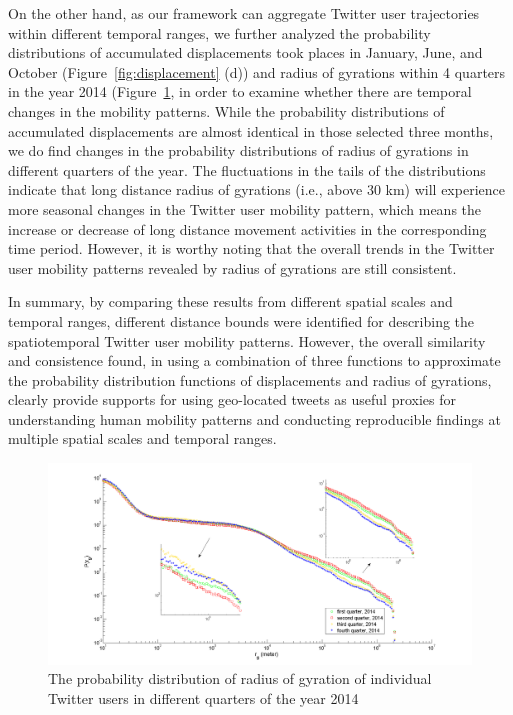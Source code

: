 \documentclass[ijgi,article,accept,moreauthors,pdftex,10pt,a4paper]{mdpi}
\theoremstyle{mdpi}
\newcounter{ex}
\newcounter{re}
\theoremstyle{mdpidefinition}
\begin{document}
On the other hand, as our framework can aggregate Twitter user trajectories within different temporal ranges, we further analyzed the probability distributions of accumulated displacements took places in January, June, and October (Figure~\ref{fig:displacement} (d)) and radius of gyrations within 4 quarters in the year 2014 (Figure~\ref{fig:gyration_season}, in order to examine whether there are temporal changes in the mobility patterns.
While the probability distributions of accumulated displacements are almost identical in those selected three months,  we do find changes in the probability distributions of radius of gyrations in different quarters of the year. 
The fluctuations in the tails of the distributions indicate that long distance radius of gyrations (i.e., above 30 km) will experience more seasonal changes in the Twitter user mobility pattern, which means the increase or decrease of long distance movement activities in the corresponding time period. 
However, it is worthy noting that the overall trends in the Twitter user mobility patterns revealed by radius of gyrations are still consistent.

In summary, by comparing these results from different spatial scales and temporal ranges, different distance bounds were identified for describing the spatiotemporal Twitter user mobility patterns.
However, the overall similarity and consistence found, in using a combination of three functions to approximate the probability distribution functions of displacements and radius of gyrations, clearly provide supports for using geo-located tweets as useful proxies for understanding human mobility patterns and conducting reproducible findings at multiple spatial scales and temporal ranges.
 
\begin{figure}[ht]
\centering
\includegraphics[width=1.0\linewidth]{./figures/gyration_season}
\caption{The probability distribution of radius of gyration of individual Twitter users in different quarters of the year 2014}
\label{fig:gyration_season}
\end{figure}
\FloatBarrier
\end{document}
